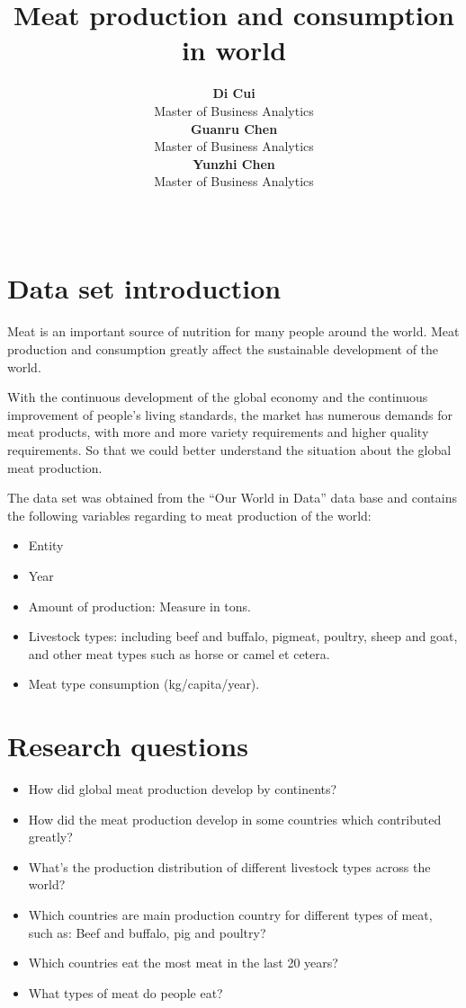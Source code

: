 \documentclass[11pt,a4paper,]{article}
\title{Meat production and consumption in world}
\author{\sf\Large\textbf{ Di Cui}\\ {\sf\large Master of Business Analytics\\[0.5cm]} \sf\Large\textbf{ Guanru Chen}\\ {\sf\large Master of Business Analytics\\[0.5cm]} \sf\Large\textbf{ Yunzhi Chen}\\ {\sf\large Master of Business Analytics\\[0.5cm]}}
\date{\sf\Date~\Month~\Year}
\makeatletter
\providecommand{\tightlist}{%
  \setlength{\itemsep}{0pt}\setlength{\parskip}{0pt}}
\def\titlepage{\front{\expandafter{\@title}}{\@author}{\@organization}}
\makeatother
\begin{document}
\titlepage

\hypertarget{data-set-introduction}{%
\section{Data set introduction}\label{data-set-introduction}}

Meat is an important source of nutrition for many people around the world. Meat production and consumption greatly affect the sustainable development of the world.

With the continuous development of the global economy and the continuous improvement of people's living standards, the market has numerous demands for meat products, with more and more variety requirements and higher quality requirements. So that we could better understand the situation about the global meat production.

The data set was obtained from the ``Our World in Data'' data base and contains the following variables regarding to meat production of the world:

\begin{itemize}
\tightlist
\item
  Entity
\item
  Year
\item
  Amount of production: Measure in tons.
\item
  Livestock types: including beef and buffalo, pigmeat, poultry, sheep and goat, and other meat types such as horse or camel et cetera.
\item
  Meat type consumption (kg/capita/year).
\end{itemize}

\hypertarget{research-questions}{%
\section{Research questions}\label{research-questions}}

\begin{itemize}
\tightlist
\item
  How did global meat production develop by continents?
\item
  How did the meat production develop in some countries which contributed greatly?
\item
  What's the production distribution of different livestock types across the world?
\item
  Which countries are main production country for different types of meat, such as: Beef and buffalo, pig and poultry?
\item
  Which countries eat the most meat in the last 20 years?
\item
  What types of meat do people eat?
\end{itemize}
\end{document}

